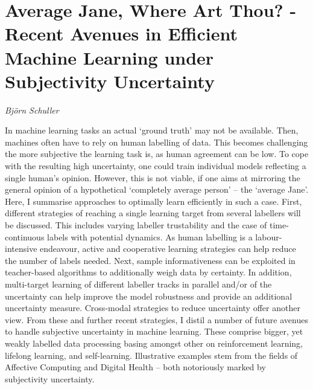 \documentclass[../booklet.tex]{subfiles}
\begin{document}
\section[Average Jane, Where Art Thou? - Recent Avenues in Efficient Machine Learning under Subjectivity Uncertainty. {\it Björn Schuller}]{Average Jane, Where Art Thou? - Recent Avenues in Efficient Machine Learning under Subjectivity Uncertainty}

\begin{center}
  {\it Björn Schuller}
\end{center}

\vskip 0.8cm


In machine learning tasks an actual `ground truth' may not be available. Then, machines often have to rely on human labelling of data. This becomes challenging the more subjective the learning task is, as human agreement can be low. To cope with the resulting high uncertainty, one could train individual models reflecting a single human's opinion. However, this is not viable, if one aims at mirroring the general opinion of a hypothetical `completely average person' -- the `average Jane'. Here, I summarise approaches to optimally learn efficiently in such a case. First, different strategies of reaching a single learning target from several labellers will be discussed. This includes varying labeller trustability and the case of time-continuous labels with potential dynamics. As human labelling is a labour-intensive endeavour, active and cooperative learning strategies can help reduce the number of labels needed. Next, sample informativeness can be exploited in teacher-based algorithms to additionally weigh data by certainty. In addition, multi-target learning of different labeller tracks in parallel and/or of the uncertainty can help improve the model robustness and provide an additional uncertainty measure. Cross-modal strategies to reduce uncertainty offer another view. From these and further recent strategies, I distil a number of future avenues to handle subjective uncertainty in machine learning. These comprise bigger, yet weakly labelled data processing basing amongst other on reinforcement learning, lifelong learning, and self-learning. Illustrative examples stem from the fields of Affective Computing and Digital Health -- both notoriously marked by subjectivity uncertainty.

\end{document}
